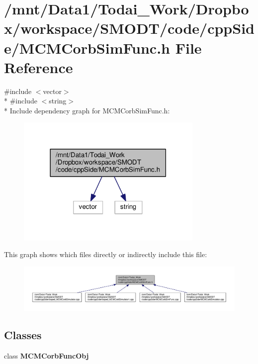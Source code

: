 \section{/mnt/\-Data1/\-Todai\-\_\-\-Work/\-Dropbox/workspace/\-S\-M\-O\-D\-T/code/cpp\-Side/\-M\-C\-M\-Corb\-Sim\-Func.h File Reference}
\label{_m_c_m_corb_sim_func_8h}
{\ttfamily \#include $<$vector$>$}\\*
{\ttfamily \#include $<$string$>$}\\*
Include dependency graph for M\-C\-M\-Corb\-Sim\-Func.\-h\-:\nopagebreak
\begin{figure}[H]
\begin{center}
\leavevmode
\includegraphics[width=254pt]{_m_c_m_corb_sim_func_8h__incl}
\end{center}
\end{figure}
This graph shows which files directly or indirectly include this file\-:\nopagebreak
\begin{figure}[H]
\begin{center}
\leavevmode
\includegraphics[width=350pt]{_m_c_m_corb_sim_func_8h__dep__incl}
\end{center}
\end{figure}
\subsection*{Classes}
\begin{DoxyCompactItemize}
\item 
class {\bf M\-C\-M\-Corb\-Func\-Obj}
\end{DoxyCompactItemize}
